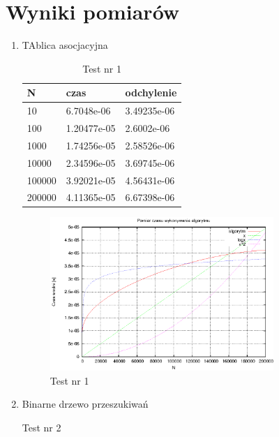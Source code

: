 \documentclass[a4paper,11pt]{article}
\begin{document}
\section{Wyniki pomiarów}
\begin{enumerate}
 \item TAblica asocjacyjna
   
  \begin{table}[th]
    \caption{Test nr 1}

      \begin{tabular}{l|l|l}
	\hline
	N & czas & odchylenie \\
    \hline
  10 & 6.7048e-06 &  3.49235e-06\\
  \hline
100 & 1.20477e-05 &  2.6002e-06\\
\hline
1000 & 1.74256e-05 &  2.58526e-06\\
\hline
10000 & 2.34596e-05 &  3.69745e-06\\
\hline
100000 & 3.92021e-05 &  4.56431e-06\\
\hline
200000 & 4.11365e-05 &  6.67398e-06\\
\hline
    \end{tabular}
    \end{table}
    \newpage
 \begin{figure}[th]
\centering
\includegraphics[width=0.8\textwidth]{../prj/wykres12.eps}
\caption{Test nr 1}
\label{Test nr 1}
\end{figure} 
\item Binarne drzewo przeszukiwań

  \begin{table}[th]
    \caption{Test nr 2}


\end{table}
\end{enumerate}
\end{document}
